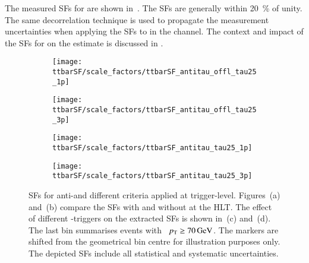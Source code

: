 The measured SFs for \antitau are shown in~. The SFs
are generally within \SI{20}{\percent} of unity. The same decorrelation
technique is used to propagate the measurement uncertainties when applying the
SFs to \antitau in the \hadhad channel. The context and impact of the SFs for
\antitau on the \multijet estimate is discussed in .

\begin{figure}[htbp]
  \centering

  \begin{subfigure}[t]{.495\textwidth}
    \texttt{[image: ttbarSF/scale\_factors/ttbarSF\_antitau\_offl\_tau25\_1p]}
    \caption{}
    \label{fig:ttbarSF_antiid_SF_a}
  \end{subfigure}\hfill%
  \begin{subfigure}[t]{.495\textwidth}
    \texttt{[image: ttbarSF/scale\_factors/ttbarSF\_antitau\_offl\_tau25\_3p]}
    \caption{}
    \label{fig:ttbarSF_antiid_SF_b}
  \end{subfigure}

  \begin{subfigure}[t]{.495\textwidth}
    \texttt{[image: ttbarSF/scale\_factors/ttbarSF\_antitau\_tau25\_1p]}
    \caption{}
    \label{fig:ttbarSF_antiid_SF_c}
  \end{subfigure}\hfill%
  \begin{subfigure}[t]{.495\textwidth}
    \texttt{[image: ttbarSF/scale\_factors/ttbarSF\_antitau\_tau25\_3p]}
    \caption{}
    \label{fig:ttbarSF_antiid_SF_d}
  \end{subfigure}

  \caption[\Faketauhadvis SFs for anti-\tauhadvis and different \tauid criteria
  applied at trigger-level.]{\Faketauhadvis SFs for anti-\tauhadvis and
    different \tauid criteria applied at trigger-level. Figures~(a) and~(b)
    compare the SFs with and without \tauid at the HLT. The effect of different
    \tauhadvis-triggers on the extracted SFs is shown in~(c) and~(d). The last
    bin summarises events with \tauhadvis~$\pT \geq \SI{70}{\GeV}$. The markers
    are shifted from the geometrical bin centre for illustration purposes
    only. The depicted SFs include all statistical and systematic
    uncertainties.}%
  \label{fig:ttbarSF_antiid_SF}
\end{figure}

